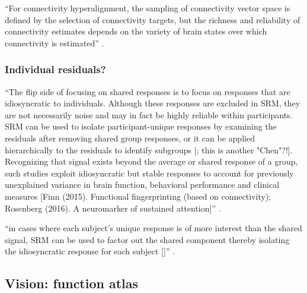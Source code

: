 %
``For connectivity hyperalignment, the sampling of connectivity vector space is
defined by the selection of connectivity targets, but the richness and
reliability of connectivity estimates depends on the variety of brain states
over which connectivity is estimated'' \citep{haxby2020hyperalignment}.


\subsubsection{Individual residuals?}



%
``The flip side of focusing on shared responses is to focus on responses that
are idiosyncratic to individuals.
%
Although these responses are excluded in SRM, they are not necessarily noise and
may in fact be highly reliable within participants.
%
SRM can be used to isolate participant-unique responses by examining the
residuals after removing shared group responses, or it can be applied
hierarchically to the residuals to identify subgroups [\citet{chen2017shared};
this is another "Chen"?!].
%
Recognizing that signal exists beyond the average or shared response of a group,
such studies exploit idiosyncratic but stable responses to account for
previously unexplained variance in brain function, behavioral performance and
clinical measures [Finn (2015). Functional fingerprinting (based on
connectivity); Rosenberg (2016). A neuromarker of sustained attention]''
\citep{cohen2017computational}.

%
``in cases where each subject's unique response is of more interest
than the shared signal, SRM can be used to factor out the shared component
thereby isolating the idiosyncratic response for each subject
[\citep{chen2015reduced}]'' \citep{kumar2020brainiak}.


\subsection{Vision: function atlas}


